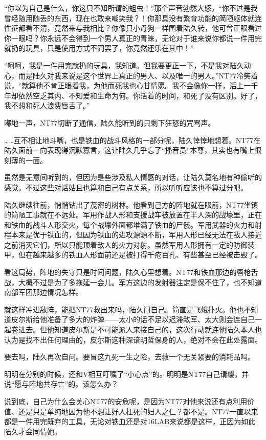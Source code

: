 “你以为自己是什么，你这只不知所谓的蛆虫！”那个声音勃然大怒，“你不过是我曾经随用随丢的东西，现在也敢来嘲笑我？！你那具没有繁育功能的简陋躯体就连性征都看不清，竟然来与我相比？你像只小母狗一样围着陆久转，他可曾正眼看过你一眼吗？你永远不会得到一个男人真正的青睐，无论对于谁来说你都说一件用完就扔的玩具，只是使用方式不同罢了，你竟然还乐在其中！”

“呵呵，我是一件用完就扔的玩具，我知道。但我要更正一下，不是我对陆久动心，而是陆久对我来说是这个世界上真正的男人、以及唯一的男人。”NT77冷笑着说，“就算他不肯正眼看我，为他而死我也心甘情愿。我不会像你一样，活上一千年却依然空乏其内、不知爱和生命为何。你活着的时间，和死了没有区别。好了，我不想和死人浪费唇舌了。”

嘟地一声，NT77切断了通信，陆久能听到的只剩下狂怒的咒骂声。

……互不相让地斗嘴，也是铁血的战斗风格的一部分呢，陆久悻悻地想着。NT77在陆久面前一向表现得沉默寡言，这让陆久几乎忘了“播音员”本尊，其实也有嘴上很刻薄的一面。

虽然是无意间听到的，但因为是些涉及私人情感的对话，让陆久莫名地有种偷听的感觉。不过这些对话姑且也算和自己有点关系，所以听听应该也不算过分吧。

陆久继续往前，悄悄钻出了茂密的树林。他看到己方的阵地就在眼前，NT77坐镇的简陋工事就在不远处。军用作战人形和支援战车被放置在半人深的战壕里，正在和铁血的战斗人形交火，每个战壕外面都堆满了铁血的尸骸。军用武器的火力和射程本来是优于铁血的，但因为铁血的进攻源源不断，军用人形已经无法在敌人接近之前消灭它们，所以只能顶着敌人的火力对射。虽然军用人形拥有一定的防御装甲，但在越来越多的铁血人形面前还是被打得千疮百孔、有些甚至已经被击毁了。

看这局势，阵地的失守只是时间问题，陆久心里想着。NT77和铁血那边的唇枪舌战，大概不过是为了多拖延一会儿。军方这边的发射器注定是保不住了，也不知道南部军团那边情况怎样。

就这样冲进敌阵，能把NT77救出来吗，陆久问自己。简直是飞蛾扑火。他也不知道皮尔斯给他准备了多大的炸弹——太小的话不足以迟滞敌军、太大则会连自己一起卷进去。但他知道皮尔斯是不可能派人来接自己的，这次行动就连他陆久本人也认为是找不出任何理由的，皮尔斯这种深谙明哲保身的人，绝对不会在此处露面。

要去吗，陆久再次自问。要冒这九死一生之险，去救一个无关紧要的消耗品吗。

明明在分别的时候，还和V相互叮嘱了“小心点”的。明明是NT77自己请缨，并说“愿与阵地共存亡”的。该怎么办？

说到底，自己为什么会关心NT77的安危呢，是因为NT77对他来说还有点利用价值、还是只是单纯地因为他不想让好人枉死的妇人之仁？都不是。NT77一直以来都是一件用完既弃的工具，无论对铁血还是对16LAB来说都是这样，正因为如此陆久才会同情她。

